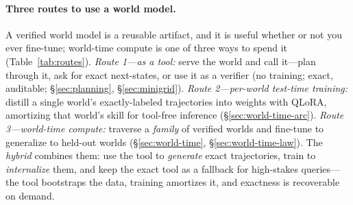 \documentclass[11pt]{article}
\begin{document}
\paragraph{Three routes to use a world model.} A verified world model is a reusable artifact, and
it is useful whether or not you ever fine-tune; world-time compute is one of three ways to spend
it (Table~\ref{tab:routes}). \emph{Route 1---as a tool:} serve the world and call it---plan
through it, ask for exact next-states, or use it as a verifier (no training; exact, auditable;
\S\ref{sec:planning}, \S\ref{sec:minigrid}). \emph{Route 2---per-world test-time training:}
distill a single world's exactly-labeled trajectories into weights with QLoRA, amortizing that
world's skill for tool-free inference (\S\ref{sec:world-time-arc}). \emph{Route 3---world-time
compute:} traverse a \emph{family} of verified worlds and fine-tune to generalize to held-out
worlds (\S\ref{sec:world-time}, \S\ref{sec:world-time-law}). The \emph{hybrid} combines them: use
the tool to \emph{generate} exact trajectories, train to \emph{internalize} them, and keep the
exact tool as a fallback for high-stakes queries---the tool bootstraps the data, training
amortizes it, and exactness is recoverable on demand.

\begin{table}[t]\centering\small
{}
\caption{\textbf{Three routes to use a verified world model}, plus the hybrid. Need
exactness/audit $\to$ Route 1; amortize one world $\to$ Route 2; generalize a family $\to$
Route 3; best of both $\to$ Hybrid.}
\label{tab:routes}
\end{table}
\end{document}
